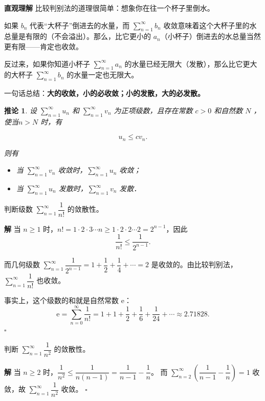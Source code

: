 \documentclass[fontset=fandol]{ctexart}
\newenvironment{solution}{\par\noindent\textbf{解}\quad}{\hfill$\square$\par\vspace{0.8em}}
\newenvironment{intuition}{\par\noindent\textbf{直观理解}\quad}{\par\vspace{0.8em}}
\newtheorem{corollary}{推论}[section] \newtheorem{property}{性质}[section]
\newcommand{\ee}{\mathrm{e}}
\begin{document}
\begin{intuition}
比较判别法的道理很简单：想象你在往一个杯子里倒水。

如果 \(b_n\) 代表“大杯子”倒进去的水量，而 \(\sum\limits_{n = 1}^{  \infty } b_n\) 收敛意味着这个大杯子里的水总量是有限的（不会溢出）。那么，比它更小的 \(a_n\)（小杯子）倒进去的水总量当然更有限——肯定也收敛。

反过来，如果你知道小杯子 \(\sum\limits_{n = 1}^{  \infty } a_n\) 的水量已经无限大（发散），那么比它更大的大杯子 \(\sum\limits_{n = 1}^{  \infty } b_n\) 的水量一定也无限大。

一句话总结：\textbf{大的收敛，小的必收敛；小的发散，大的必发散。}
\end{intuition}


\begin{corollary}
	设 $\sum\limits_{n = 1}^{  \infty } u_n$ 和 $\sum\limits_{n = 1}^{  \infty } v_n$ 为正项级数，且存在常数 $c>0$ 和自然数 $N$ ，使当$n>N$ 时，有
	
	$$
	u_n \leqslant c v_n .
	$$
	
	则有
	\begin{itemize}
		\item[（1）] 当 $\sum\limits_{n = 1}^{  \infty } v_n$ 收敛时，$\sum\limits_{n = 1}^{  \infty } u_n$ 收敛；
		\item[（2）] 当 $\sum\limits_{n = 1}^{  \infty } u_n$ 发散时，$\sum\limits_{n = 1}^{  \infty } v_n$ 发散．
	\end{itemize}
\end{corollary}

\begin{example}
判断级数 \(\sum\limits_{n = 1}^{  \infty } \dfrac{1}{n!}\) 的敛散性。
\end{example}

\begin{solution}
当 \(n \geq 1\) 时，\(n! = 1 \cdot 2 \cdot 3 \cdots n \geq 1 \cdot 2 \cdot 2 \cdots 2 = 2^{n-1}\)，因此
\[
\dfrac{1}{n!} \leq \dfrac{1}{2^{n-1}}.
\]

而几何级数 \(\sum\limits_{n = 1}^{  \infty } \dfrac{1}{2^{n-1}} = 1 + \dfrac12 + \dfrac14 + \cdots = 2\) 是收敛的。由比较判别法，\(\sum\limits_{n = 1}^{  \infty } \dfrac{1}{n!}\) 也收敛。

事实上，这个级数的和就是自然常数 \(\ee\)：
\[
\ee = \sum_{n=0}^{\infty} \dfrac{1}{n!} = 1 + 1 + \dfrac12 + \dfrac16 + \dfrac{1}{24} + \cdots \approx 2.71828.
\]
\end{solution}

\begin{example}
判断 \(\sum\limits_{n = 1}^{  \infty } \dfrac{1}{n^2}\) 的敛散性。
\end{example}
\begin{solution}
当 \(n \geq 2\) 时，\(\dfrac{1}{n^2} \leq \dfrac{1}{n(n-1)} = \dfrac{1}{n-1} - \dfrac{1}{n}\)。
而 \(\sum\limits_{n = 2}^{  \infty } \left(\dfrac{1}{n-1} - \dfrac{1}{n}\right) = 1\) 收敛，故 \(\sum\limits_{n = 1}^{  \infty } \dfrac{1}{n^2}\) 收敛。
\end{solution}
\end{document}
